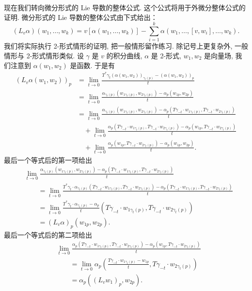 现在我们转向微分形式的 Lie 导数的整体公式. 这个公式将用于外微分整体公式的证明. 微分形式的 Lie 导数的整体公式由下式给出：
\[
\left(L_v\alpha\right)(w_1,\ldots,w_k)=v\left[\alpha(w_1,\ldots,w_k)\right]-\sum_{i=1}^{k}\alpha\left(w_1,\ldots,[v,w_i],\ldots,w_k\right).
\]
我们将实际执行 2-形式情形的证明, 把一般情形留作练习. 除记号上更复杂外, 一般情形与 2-形式情形类似. 设 $\gamma$ 是 $v$ 的积分曲线, $\alpha$ 是 2-形式, $w_1,w_2$ 是向量场, 我们注意到 $\alpha(w_1,w_2)$ 是函数. 于是有
\begin{align*}
\left(L_v\alpha(w_1,w_2)\right)_p&=\lim_{t\to0}\frac{T^*\gamma_t\left(\alpha(w_1,w_2)\right)_{\gamma_t(p)}-\left(\alpha(w_1,w_2)\right)_p}{t}\\
&=\lim_{t\to0}\frac{\alpha_{\gamma_t(p)}\left(w_{1\gamma_t(p)},w_{2\gamma_t(p)}\right)-\alpha_p\left(w_{1p},w_{2p}\right)}{t}\\
&=\lim_{t\to0}\frac{\alpha_{\gamma_t(p)}\left(w_{1\gamma_t(p)},w_{2\gamma_t(p)}\right)-\alpha_p\left(T\gamma_{-t}\cdot w_{1\gamma_t(p)},T\gamma_{-t}\cdot w_{2\gamma_t(p)}\right)}{t}\\
&\quad+\lim_{t\to0}\frac{\alpha_p\left(T\gamma_{-t}\cdot w_{1\gamma_t(p)},T\gamma_{-t}\cdot w_{2\gamma_t(p)}\right)-\alpha_p\left(w_{1p},T\gamma_{-t}\cdot w_{2\gamma_t(p)}\right)}{t}\\
&\quad+\lim_{t\to0}\frac{\alpha_p\left(w_{1p},T\gamma_{-t}\cdot w_{2\gamma_t(p)}\right)-\alpha_p\left(w_{1p},w_{2p}\right)}{t}.
\end{align*}
最后一个等式后的第一项给出
\begin{align*}
&\lim_{t\to0}\frac{\alpha_{\gamma_t(p)}\left(w_{1\gamma_t(p)},w_{2\gamma_t(p)}\right)-\alpha_p\left(T\gamma_{-t}\cdot w_{1\gamma_t(p)},T\gamma_{-t}\cdot w_{2\gamma_t(p)}\right)}{t}\\
&\qquad=\lim_{t\to0}\frac{T^*\gamma_t\cdot\alpha_{\gamma_t(p)}\left(T\gamma_{-t}\cdot w_{1\gamma_t(p)},T\gamma_{-t}\cdot w_{2\gamma_t(p)}\right)-\alpha_p\left(T\gamma_{-t}\cdot w_{1\gamma_t(p)},T\gamma_{-t}\cdot w_{2\gamma_t(p)}\right)}{t}\\
&\qquad=\lim_{t\to0}\frac{T^*\gamma_t\cdot\alpha_{\gamma_t(p)}-\alpha_p}{t}\left(T\gamma_{-t}\cdot w_{1\gamma_t(p)},T\gamma_{-t}\cdot w_{2\gamma_t(p)}\right)\\
&\qquad=\left(L_v\alpha\right)_p\left(w_{1p},w_{2p}\right).
\end{align*}
最后一个等式后的第二项给出
\begin{align*}
&\lim_{t\to0}\frac{\alpha_p\left(T\gamma_{-t}\cdot w_{1\gamma_t(p)},T\gamma_{-t}\cdot w_{2\gamma_t(p)}\right)-\alpha_p\left(w_{1p},T\gamma_{-t}\cdot w_{2\gamma_t(p)}\right)}{t}\\
&\qquad=\lim_{t\to0}\alpha_p\left(\frac{T\gamma_{-t}\cdot w_{1\gamma_t(p)}-w_{1p}}{t},T\gamma_{-t}\cdot w_{2\gamma_t(p)}\right)\\
&\qquad=\alpha_p\left(\left(L_vw_1\right)_p,w_{2p}\right).
\end{align*}
